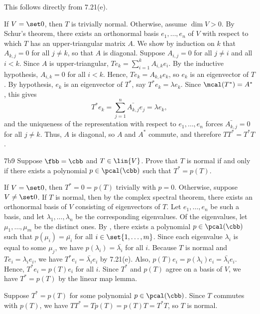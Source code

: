 \begin{soliff}
    \rightimp This follows directly from 7.21(e).

    \leftimp If $V = \set 0$, then $T$ is trivially normal.
    Otherwise, assume $\dim V > 0$.
    By Schur's theorem, there exists an orthonormal basis $e_1, \ldots, e_n$ of $V$ with respect to which $T$ has an upper-triangular matrix $A$.
    We show by induction on $k$ that $A_{k, j} = 0$ for all $j \neq k$, so that $A$ is diagonal.
    Suppose $A_{i, j} = 0$ for all $j \neq i$ and all $i < k$.
    Since $A$ is upper-triangular, $T e_k = \sum_{i=1}^k A_{i, k} e_i$.
    By the inductive hypothesis, $A_{i, k} = 0$ for all $i < k$.
    Hence, $T e_k = A_{k, k} e_k$, so $e_k$ is an eigenvector of $T$.
    By hypothesis, $e_k$ is an eigenvector of $T^\ast$, say $T^\ast e_k = \lambda e_k$.
    Since $\mcal(T^\ast) = A^\ast$, this gives
    \[
        T^\ast e_k = \sum_{j=1}^n \bar{A_{k, j}} e_j = \lambda e_k,
    \]
    and the uniqueness of the representation with respect to $e_1, \ldots, e_n$ forces $\bar{A_{k, j}} = 0$ for all $j \neq k$.
    Thus, $A$ is diagonal, so $A$ and $A^\ast$ commute, and therefore $T T^\ast = T^\ast T$.
\end{soliff}

\begin{exercise}{7b9}
    Suppose $\fbb = \cbb$ and $T \in \lin{V}$.
    Prove that $T$ is normal if and only if there exists a polynomial $p \in \pcal(\cbb)$ such that $T^\ast = p(T)$.
\end{exercise}

\begin{soliff}
    \rightimp If $V = \set 0$, then $T^\ast = 0 = p(T)$ trivially with $p = 0$.
    Otherwise, suppose $V \neq \set 0$.
    If $T$ is normal, then by the complex spectral theorem, there exists an orthonormal basis of $V$ consisting of eigenvectors of $T$.
    Let $e_1, \ldots, e_n$ be such a basis, and let $\lambda_1, \ldots, \lambda_n$ be the corresponding eigenvalues.
    Of the eigenvalues, let $\mu_1, \ldots, \mu_m$ be the distinct ones.
    By , there exists a polynomial $p \in \pcal(\cbb)$ such that $p(\mu_i) = \bar{\mu_i}$ for all $i \in \set{1, \ldots, m}$.
    Since each eigenvalue $\lambda_i$ is equal to some $\mu_j$, we have $p(\lambda_i) = \bar{\lambda_i}$ for all $i$.
    Because $T$ is normal and $T e_i = \lambda_i e_i$, we have $T^\ast e_i = \bar{\lambda_i} e_i$ by 7.21(e).
    Also, $p(T) e_i = p(\lambda_i) e_i = \bar{\lambda_i} e_i$.
    Hence, $T^\ast e_i = p(T) e_i$ for all $i$.
    Since $T^\ast$ and $p(T)$ agree on a basis of $V$, we have $T^\ast = p(T)$ by the linear map lemma.

    \leftimp Suppose $T^\ast = p(T)$ for some polynomial $p \in \pcal(\cbb)$.
    Since $T$ commutes with $p(T)$, we have $T T^\ast = T p(T) = p(T) T = T^\ast T$, so $T$ is normal.
\end{soliff}


